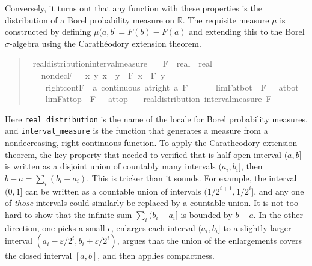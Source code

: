 \documentclass{svjour3}
\newcommand{\RR}{\mathbb{R}}
\begin{document}
Conversely, it turns out that any function with these properties is the distribution of a Borel probability measure on $\RR$. The requisite measure $\mu$ is constructed by defining $\mu (a,b] = F(b) - F(a)$ and extending this to the Borel $\sigma$-algebra using the Carath\'eodory extension theorem.
\begin{quote}
\begin{isabellebody}
\isamarkupfalse%
\ real{\isacharunderscore}distribution{\isacharunderscore}interval{\isacharunderscore}measure{\isacharcolon}\isanewline
\ \ \ F\ {\isacharcolon}{\isacharcolon}\ {\isachardoublequoteopen}real\ {\isasymRightarrow}\ real{\isachardoublequoteclose}\isanewline
\ \ \ nondecF\ {\isacharcolon}\ {\isachardoublequoteopen}{\isasymAnd}\ x\ y{\isachardot}\ x\ {\isasymle}\ y\ {\isasymLongrightarrow}\ F\ x\ {\isasymle}\ F\ y{\isachardoublequoteclose}\ \isanewline
\ \ \ \ right{\isacharunderscore}cont{\isacharunderscore}F\ {\isacharcolon}\ {\isachardoublequoteopen}{\isasymAnd}a{\isachardot}\ continuous\ {\isacharparenleft}at{\isacharunderscore}right\ a{\isacharparenright}\ F{\isachardoublequoteclose}\ \ \isanewline
\ \ \ \ lim{\isacharunderscore}F{\isacharunderscore}at{\isacharunderscore}bot\ {\isacharcolon}\ {\isachardoublequoteopen}{\isacharparenleft}F\ {\isacharminus}{\isacharminus}{\isacharminus}{\isachargreater}\ {}{\isacharparenright}\ at{\isacharunderscore}bot{\isachardoublequoteclose}\ \isanewline
\ \ \ \ lim{\isacharunderscore}F{\isacharunderscore}at{\isacharunderscore}top\ {\isacharcolon}\ {\isachardoublequoteopen}{\isacharparenleft}F\ {\isacharminus}{\isacharminus}{\isacharminus}{\isachargreater}\ {}{\isacharparenright}\ at{\isacharunderscore}top{\isachardoublequoteclose}\isanewline
\ \ \ {\isachardoublequoteopen}real{\isacharunderscore}distribution\ {\isacharparenleft}interval{\isacharunderscore}measure\ F{\isacharparenright}{\isachardoublequoteclose}
\end{isabellebody}
\end{quote}
Here \texttt{real\_distribution} is the name of the locale for Borel probability measures, and \texttt{interval\_measure} is the function that generates a measure from a nondecreasing, right-continuous function. To apply the Caratheodory extension theorem, the key property that needed to verified that is half-open interval $(a, b]$ is written as a disjoint union of countably many intervals $(a_i, b_i]$, then $b - a = \sum_i (b_i - a_i)$. This is tricker than it sounds. For example, the interval $(0, 1]$ can be written as a countable union of intervals $(1/2^{i+1}, 1/2^i]$, and any one of \emph{those} intervals could similarly be replaced by a countable union. It is not too hard to show that the infinite sum $\sum_i (b_i - a_i]$ is bounded by $b - a$. In the other direction, one picks a small $\epsilon$, enlarges each interval $(a_i, b_i]$ to a slightly larger interval $(a_i - \varepsilon/2^i, b_i + \varepsilon / 2^i)$, argues that the union of the enlargements covers the closed interval $[a, b]$, and then applies compactness.
\end{document}
